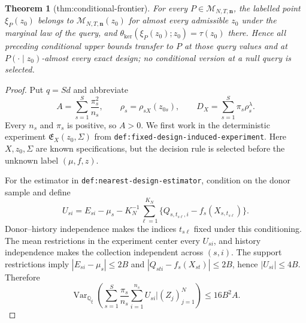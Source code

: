 \documentclass{article}
\newtheorem{theorem}{Theorem}
\begin{document}
\begin{theorem}[thm:conditional-frontier]
For every \(P\in\mathcal M_{N,T,\mathbf n}\), the labelled point
\(\xi_P(z_0)\) belongs to \(\mathcal M_{N,T,\mathbf n}(z_0)\) for almost
every admissible \(z_0\) under the marginal law of the query, and
\(\theta_{\mathrm{ker}}(\xi_P(z_0);z_0)=\tau(z_0)\) there.  Hence all
preceding conditional upper bounds transfer to \(P\) at those query values
and at \(P(\cdot\mid z_0)\)-almost every exact design; no conditional version
at a null query is selected.
\end{theorem}
\begin{proof}
Put \(q=Sd\) and abbreviate
\[
 A=\sum_{s=1}^{S}\frac{\pi_s^2}{n_s},
 \qquad
 \rho_s=\rho_{sX}(z_{0s}),
 \qquad
 D_X=\sum_{s=1}^{S}\pi_s\rho_s^\lambda.                   \tag{1}
\]
Every \(n_s\) and \(\pi_s\) is positive, so \(A>0\).  We first work in the deterministic experiment \(\mathfrak E_X(z_0,\Sigma)\) from \texttt{def:fixed-design-induced-experiment}.  Here \(X,z_0,\Sigma\) are known specifications, but the decision rule is selected before the unknown label \((\mu,f,z)\).

For the estimator in \texttt{def:nearest-design-estimator}, condition on the donor sample and define
\[
 U_{si}=E_{si}-\mu_s-K_N^{-1}\sum_{\ell=1}^{K_N}
 \{Q_{s,t_{s\ell},i}-f_s(X_{s,t_{s\ell}})\}.               \tag{2}
\]
Donor--history independence makes the indices \(t_{s\ell}\) fixed under this conditioning.  The mean restrictions in the experiment center every \(U_{si}\), and history independence makes the collection independent across \((s,i)\).  The support restrictions imply \(|E_{si}-\mu_s|\le2B\) and \(|Q_{sti}-f_s(X_{st})|\le2B\), hence \(|U_{si}|\le4B\).  Therefore
\[
 \operatorname{Var}_{\mathbb Q_\xi}\!\left(
 \sum_{s=1}^{S}\frac{\pi_s}{n_s}\sum_{i=1}^{n_s}U_{si}
 \mathrel{\Big|}(Z_j)_{j=1}^{N}\right)
 \le16B^2A.                                                 \tag{3}
\]


\end{proof}
\end{document}
